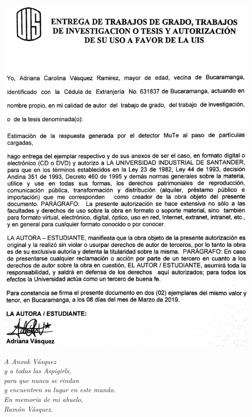 \documentclass[12pt,oneside,openany,letter]{book}
\begin{document}
\includegraphics[scale=0.9]{images/carta.png}
\newpage
\begin{flushright}
\vspace{5 cm}
\textit{A Anouk V\'asquez \\
y a todas las Aspigirls,\\
para que nunca se rindan \\
y encuentren su lugar en este mundo.\\
En memoria de mi abuelo,\\
Ram\'on V\'asquez.\\}

\vspace{0.5cm}

\end{flushright}
\end{document}

